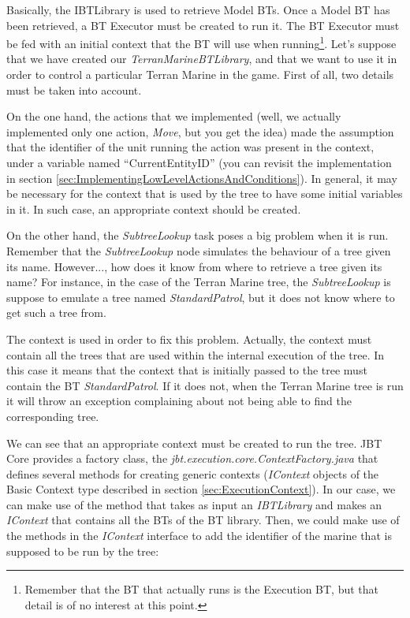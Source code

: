 \documentclass[a4paper]{article}
\begin{document}
Basically, the IBTLibrary is used to retrieve Model BTs. Once a Model BT has been retrieved, a BT Executor must be created to run it. The BT Executor must be fed with an initial context that the BT will use when running\footnote{Remember that the BT that actually runs is the Execution BT, but that detail is of no interest at this point.}. Let's suppose that we have created our \textit{TerranMarineBTLibrary}, and that we want to use it in order to control a particular Terran Marine in the game. First of all, two details must be taken into account.

On the one hand, the actions that we implemented (well, we actually implemented only one action, \textit{Move}, but you get the idea) made the assumption that the identifier of the unit running the action was present in the context, under a variable named ``CurrentEntityID'' (you can revisit the implementation in section \ref{sec:ImplementingLowLevelActionsAndConditions}). In general, it may be necessary for the context that is used by the tree to have some initial variables in it. In such case, an appropriate context should be created.

On the other hand, the \textit{SubtreeLookup} task poses a big problem when it is run. Remember that the \textit{SubtreeLookup} node simulates the behaviour of a tree given its name. However..., how does it know from where to retrieve a tree given its name? For instance, in the case of the Terran Marine tree, the \textit{SubtreeLookup} is suppose to emulate a tree named \textit{StandardPatrol}, but it does not know where to get such a tree from. 

The context is used in order to fix this problem. Actually, the context must contain all the trees that are used within the internal execution of the tree. In this case it means that the context that is initially passed to the tree must contain the BT \textit{StandardPatrol}. If it does not, when the Terran Marine tree is run it will throw an exception complaining about not being able to find the corresponding tree.

We can see that an appropriate context must be created to run the tree. JBT Core provides a factory class, the \textit{jbt.execution.core.ContextFactory.java} that defines several methods for creating generic contexts (\textit{IContext} objects of the Basic Context type described in section \ref{sec:ExecutionContext}). In our case, we can make use of the method that takes as input an \textit{IBTLibrary} and makes an \textit{IContext} that contains all the BTs of the BT library. Then, we could make use of the methods in the \textit{IContext} interface to add the identifier of the marine that is supposed to be run by the tree:
\end{document}
